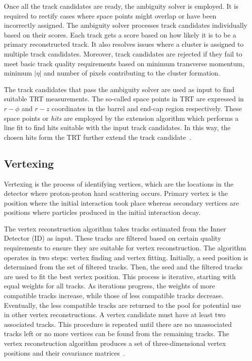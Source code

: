 Once all the track candidates are ready, the ambiguity solver is employed. It is required to rectify cases where space points might overlap or have been incorrectly assigned. 
The ambiguity solver processes track candidates individually based on their scores. Each track gets a score based on how likely it is to be a primary reconstructed track. 
It also resolves issues where a cluster is assigned to multiple track candidates. Moreover, track candidates are rejected if they fail to meet basic track quality requirements based on
minimum transverse momentum, minimum $|\eta|$ and number of pixels contributing to the cluster formation.

The track candidates that pass the ambiguity solver are used as input to find suitable TRT measurements. The so-called space points in TRT are expressed in $r-\phi$
and $r-z$ coordinates in the barrel and end-cap region respectively. These space points or \textit{hits} are employed by the extension algorithm which performs
a line fit to find hits suitable with the input track candidates. In this way, the chosen hits form the TRT further extend the track candidate~\cite{T_Cornelissen_2008}.

\subsection{Vertexing}
Vertexing is the process of identifying vertices, which are the locations in the detector where proton-proton hard scattering occurs.
Primary vertex is the position where the initial interaction took place whereas secondary vertices
are positions where particles produced in the initial interaction decay.

The vertex reconstruction algorithm takes tracks estimated from the Inner Detector (ID) as input. These tracks are filtered based on certain quality requirements to ensure 
they are suitable for vertex reconstruction. The algorithm operates in two steps: vertex finding and vertex fitting. Initially, a seed position is determined from the set of 
filtered tracks. Then, the seed and the filtered tracks are used to fit the best vertex position. This process is iterative, starting with equal weights for all tracks. As iterations 
progress, the weights of more compatible tracks increase, while those of less compatible tracks decrease. Eventually, the less compatible tracks are returned to the pool for potential 
use in other vertex reconstructions. A vertex candidate must have at least two associated tracks. This procedure is repeated until there are no unassociated tracks left or no more 
vertices can be found from the remaining tracks. The vertex reconstruction algorithm produces a set of three-dimensional vertex positions and their covariance 
matrices~\cite{F_Meloni_vertex}.

